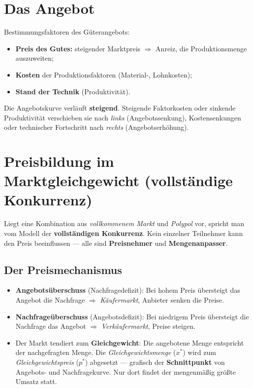 \documentclass[11pt, a4paper]{article}
\begin{document}
\section{Das Angebot}

Bestimmungsfaktoren des Güterangebots:

\begin{itemize}
  \item \textbf{Preis des Gutes:} steigender Marktpreis $\Rightarrow$ Anreiz, die
    Produktionsmenge auszuweiten;
  \item \textbf{Kosten} der Produktionsfaktoren (Material-, Lohnkosten);
  \item \textbf{Stand der Technik} (Produktivität).
\end{itemize}

Die Angebotskurve verläuft \textbf{steigend}. Steigende Faktorkosten oder sinkende
Produktivität verschieben sie nach \emph{links} (Angebotssenkung), Kostensenkungen oder
technischer Fortschritt nach \emph{rechts} (Angebotserhöhung).

\section{Preisbildung im Marktgleichgewicht (vollständige Konkurrenz)}

Liegt eine Kombination aus \emph{vollkommenem Markt} und \emph{Polypol} vor, spricht man
vom Modell der \textbf{vollständigen Konkurrenz}. Kein einzelner Teilnehmer kann den Preis
beeinflussen --- alle sind \textbf{Preisnehmer} und \textbf{Mengenanpasser}.

\subsection{Der Preismechanismus}

\begin{itemize}
  \item \textbf{Angebotsüberschuss} (Nachfragedefizit): Bei hohem Preis übersteigt das
    Angebot die Nachfrage $\Rightarrow$ \emph{Käufermarkt}, Anbieter senken die Preise.
  \item \textbf{Nachfrageüberschuss} (Angebotsdefizit): Bei niedrigem Preis übersteigt die
    Nachfrage das Angebot $\Rightarrow$ \emph{Verkäufermarkt}, Preise steigen.
  \item Der Markt tendiert zum \textbf{Gleichgewicht}: Die angebotene Menge entspricht der
    nachgefragten Menge. Die \emph{Gleichgewichtsmenge} ($x^*$) wird zum
    \emph{Gleichgewichtspreis} ($p^*$) abgesetzt --- grafisch der \textbf{Schnittpunkt} von
    Angebots- und Nachfragekurve. Nur dort findet der mengenmäßig größte Umsatz statt.
\end{itemize}
\end{document}
